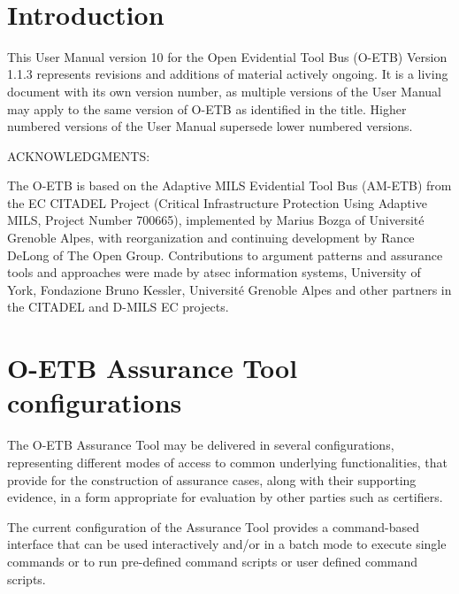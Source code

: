 \documentclass[12pt,twoside,a4paper]{article}
\begin{document}
\firstpage
\newpage
~

\newpage
\tableofcontents
\listoffigures
\listoftables
\clearpage
{}






\hypertarget{introduction}{%
\section{Introduction}\label{introduction}}

This User Manual version 10 for the Open Evidential Tool Bus (O-ETB) Version 1.1.3 represents revisions and additions of material actively ongoing. It is a living document with its own version number, as multiple versions of the User Manual may apply to the same version of O-ETB as identified in the title. Higher numbered versions of the User Manual supersede lower numbered versions.

ACKNOWLEDGMENTS:

The O-ETB is based on the Adaptive MILS Evidential Tool Bus (AM-ETB) from the EC CITADEL Project (Critical Infrastructure Protection Using Adaptive MILS, Project Number 700665), implemented by Marius Bozga of Université Grenoble Alpes, with reorganization and continuing development by Rance DeLong of The Open Group. Contributions to argument patterns and assurance tools and approaches were made by atsec information systems, University of York, Fondazione Bruno Kessler, Université Grenoble Alpes and other partners in the CITADEL and D-MILS EC projects.

\clearpage
\hypertarget{o-etb-assurance-tool-configurations}{%
\section{O-ETB Assurance Tool configurations}\label{o-etb-assurance-tool-configurations}}

The O-ETB Assurance Tool may be delivered in several configurations, representing different modes of access to common underlying functionalities, that provide for the construction of assurance cases, along with their supporting evidence, in a form appropriate for evaluation by other parties such as certifiers.

The current configuration of the Assurance Tool provides a command-based interface that can be used interactively and/or in a batch mode to execute single commands or to run pre-defined command scripts or user defined command scripts.
\end{document}
